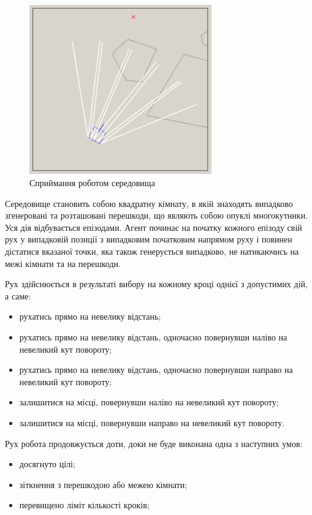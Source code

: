 \documentclass[a4paper,10pt,fleqn]{article}
\begin{document}
\begin{figure}
	\centering
    \includegraphics[width=0.7\textwidth]{perception.png}
	\caption{Сприймання роботом середовища}
	\label{fig:perception}
\end{figure}

Середовище становить собою квадратну кімнату, в якій знаходять випадково згенеровані та розташовані перешкоди, що являють собою опуклі многокутники. Уся дія відбувається епізодами. Агент починає на початку кожного епізоду свій рух у випадковій позиції з випадковим початковим напрямом руху і повинен дістатися вказаної точки, яка також генерується випадково, не натикаючись на межі кімнати та на перешкоди.

Рух здійснюється в результаті вибору на кожному кроці однієї з допустимих дій, а саме:
\begin{itemize}
	\item рухатись прямо на невелику відстань;
	\item рухатись прямо на невелику відстань, одночасно повернувши наліво на невеликий кут повороту;
	\item рухатись прямо на невелику відстань, одночасно повернувши направо на невеликий кут повороту;
	\item залишитися на місці, повернувши наліво на невеликий кут повороту;
	\item залишитися на місці, повернувши направо на невеликий кут повороту.
\end{itemize}

Рух робота продовжується доти, доки не буде виконана одна з наступних умов:
\begin{itemize}
	\item досягнуто цілі;
    \item зіткнення з перешкодою або межею кімнати;
	\item перевищено ліміт кількості кроків;
\end{itemize}
\end{document}
